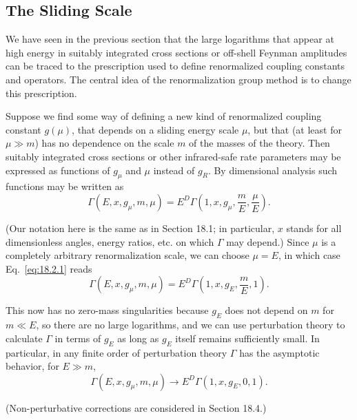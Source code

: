 \subsection{The Sliding Scale}
\label{sec:18.2}

We have seen in the previous section that the large logarithms that appear
at high energy in suitably integrated cross sections or off-shell Feynman
amplitudes can be traced to the prescription used to define renormalized
coupling constants and operators. The central idea of the renormalization
group method is to change this prescription.

Suppose we find some way of defining a new kind of renormalized coupling
constant $g(\mu)$, that depends on a sliding energy scale $\mu$, but that (at
least for $\mu\gg m$) has no dependence on the scale $m$ of the masses of the
theory. Then suitably integrated cross sections or other infrared-safe rate
parameters may be expressed as functions of $g_\mu$ and $\mu$ instead of
$g_R$. By dimensional analysis such functions may be written as
\begin{equation}
\Gamma(E,x,g_\mu,m,\mu)
=E^D\Gamma\left(1,x,g_\mu,\frac{m}{E},\frac{\mu}{E}\right).
\tag{18.2.1}\label{eq:18.2.1}
\end{equation}
\par\noindent
(Our notation here is the same as in Section 18.1; in particular, $x$ stands
for all dimensionless angles, energy ratios, etc. on which $\Gamma$ may
depend.) Since $\mu$ is a completely arbitrary renormalization scale, we can
choose $\mu=E$, in which case Eq.~\eqref{eq:18.2.1} reads
\begin{equation}
\Gamma(E,x,g_\mu,m,\mu)
=E^D\Gamma\left(1,x,g_E,\frac{m}{E},1\right).
\tag{18.2.2}\label{eq:18.2.2}
\end{equation}
\par\noindent
This now has no zero-mass singularities because $g_E$ does not depend on $m$
for $m\ll E$, so there are no large logarithms, and we can use perturbation
theory to calculate $\Gamma$ in terms of $g_E$ as long as $g_E$ itself remains
sufficiently small. In particular, in any finite order of perturbation theory
$\Gamma$ has the asymptotic behavior, for $E\gg m$,
\begin{equation}
\Gamma(E,x,g_\mu,m,\mu)\longrightarrow E^D\Gamma(1,x,g_E,0,1).
\tag{18.2.3}\label{eq:18.2.3}
\end{equation}
\par\noindent
(Non-perturbative corrections are considered in Section 18.4.)

